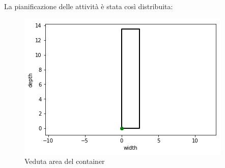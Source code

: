 La pianificazione delle attività è stata così distribuita:
\begin{figure}[H]
	\begin{center} \includegraphics[scale=0.6]{figures/cartesian_wd}
		\caption[Veduta area - piano cartesiano]{Veduta area del container}  
		\label{fig:veduta_aerea}
	\end{center}
\end{figure}
